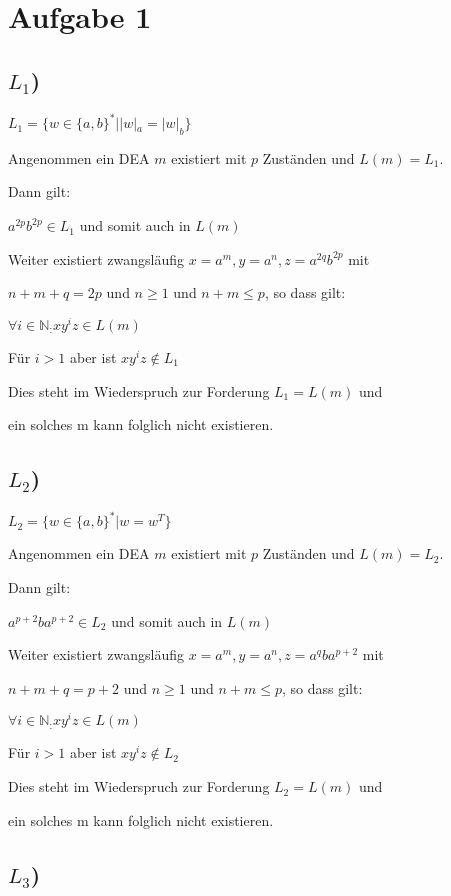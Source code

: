 \section*{Aufgabe 1}

\subsection*{$L_{1}$)}

$L_{1} = \{w\in\{a,b\}^{*}| |w|_{a} = |w|_{b}\}$

Angenommen ein DEA $m$ existiert mit $p$ Zuständen und $L(m) = L_{1}$.

Dann gilt:

$a^{2p}b^{2p} \in L_{1}$ und somit auch in $L(m)$

Weiter existiert zwangsläufig $x = a^{m}, y = a^{n}, z = a^{2q}b^{2p}$ mit

$n+m+q = 2p$ und $n \geq 1$ und $n+m \leq p$, so dass gilt:

$\forall i \in \mathbb{N}_ : xy^{i}z \in L(m)$

Für $i > 1$ aber ist $xy^{i}z \not\in L_{1}$  

Dies steht im Wiederspruch zur Forderung $L_{1} = L(m)$ und 

ein solches m kann folglich  nicht existieren.

\subsection*{$L_{2}$)}


$L_{2} = \{w\in\{a,b\}^{*}| w = w^{T}\}$

Angenommen ein DEA $m$ existiert mit $p$ Zuständen und $L(m) = L_{2}$.

Dann gilt:

$a^{p+2}ba^{p+2} \in L_{2}$ und somit auch in $L(m)$

Weiter existiert zwangsläufig $x = a^{m}, y = a^{n}, z = a^{q}ba^{p+2}$ mit

$n+m+q = p+2$ und $n \geq 1$ und $n+m \leq p$, so dass gilt:

$\forall i \in \mathbb{N}_ : xy^{i}z \in L(m)$

Für $i > 1$ aber ist $xy^{i}z \not\in L_{2}$  

Dies steht im Wiederspruch zur Forderung $L_{2} = L(m)$ und 

ein solches m kann folglich  nicht existieren.

\subsection*{$L_{3}$)}


